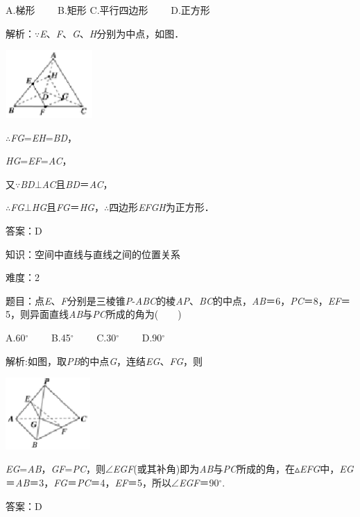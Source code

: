 \documentclass{article} %
\begin{document}
A.梯形　　 B.矩形 C.平行四边形　　 D.正方形

解析：$\mathrm{\because}$\textit{E}、\textit{F}、\textit{G}、\textit{H}分别为中点，如图．

\includegraphics*[width=1.31in, height=1.02in, keepaspectratio=false]{image109}

$\mathrm{\therefore}$\textit{FG}=\textit{EH}=\textit{BD}，

\textit{HG}=\textit{EF}=\textit{AC}，

又$\mathrm{\because}$\textit{BD}$\mathrm{\bot}$\textit{AC}且\textit{BD}＝\textit{AC}，

$\mathrm{\therefore}$\textit{FG}$\mathrm{\bot}$\textit{HG}且\textit{FG}＝\textit{HG}，$\mathrm{\therefore}$四边形\textit{EFGH}为正方形．

答案：D

知识：空间中直线与直线之间的位置关系

难度：2

题目：点\textit{E}、\textit{F}分别是三棱锥\textit{P}-\textit{ABC}的棱\textit{AP}、\textit{BC}的中点，\textit{AB}＝6，\textit{PC}＝8，\textit{EF}＝5，则异面直线\textit{AB}与\textit{PC}所成的角为(　　)

A.60$\mathrm{{}^\circ}$　　 B.45$\mathrm{{}^\circ}$　　 C.30$\mathrm{{}^\circ}$　　 D.90$\mathrm{{}^\circ}$

解析:如图，取\textit{PB}的中点\textit{G}，连结\textit{EG}、\textit{FG}，则

\includegraphics*[width=1.27in, height=1.08in, keepaspectratio=false]{image110}

\textit{EG}=\textit{AB}，\textit{GF}=\textit{PC}，则$\mathrm{\angle}$\textit{EGF}(或其补角)即为\textit{AB}与\textit{PC}所成的角，在$\mathrm{\vartriangle}$\textit{EFG}中，\textit{EG}＝\textit{AB}＝3，\textit{FG}＝\textit{PC}＝4，\textit{EF}＝5，所以$\mathrm{\angle}$\textit{EGF}＝90$\mathrm{{}^\circ}$.

答案：D
\end{document}
